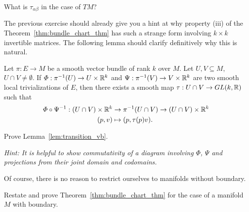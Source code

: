 \begin{exercise}
  What is $\tau_{\alpha\beta}$ in the case of $TM$?
\end{exercise}

The previous exercise should already give you a hint at why property (iii) of the Theorem~\ref{thm:bundle_chart_thm} has such a strange form involving $k\times k$ invertible matrices.
The following lemma should clarify definitively why this is natural.

\begin{lemma}\label{lem:transition_vb}
  Let $\pi:E \to M$ be a smooth vector bundle of rank $k$ over $M$. Let $U,V\subseteq M$, $U\cap V\neq \emptyset$.
  If $\varPhi : \pi^{-1}(U) \to U \times \mathbb{R}^k$ and $\Psi: \pi^{-1}(V) \to V \times \mathbb{R}^k$ are two smooth local trivializations of $E$, then there exists a smooth map $\tau: U\cap V \to GL(k, \mathbb{R})$ such that
  \begin{align}
    \varPhi\circ\Psi^{-1} : (U\cap V)\times\mathbb{R}^k & \to \pi^{-1}(U\cap V) \to (U\cap V)\times \mathbb{R}^k \\
    (p,v)                                       & \mapsto (p, \tau(p) v).
  \end{align}
\end{lemma}
\begin{exercise}
  Prove Lemma~\ref{lem:transition_vb}.

  \textit{\small Hint: It is helpful to show commutativity of a diagram involving $\varPhi$, $\Psi$ and projections from their joint domain and codomains.}
\end{exercise}

Of course, there is no reason to restrict ourselves to manifolds without boundary.
\begin{exercise}
  Restate and prove Theorem~\ref{thm:bundle_chart_thm} for the case of a manifold $M$ with boundary.
\end{exercise}

